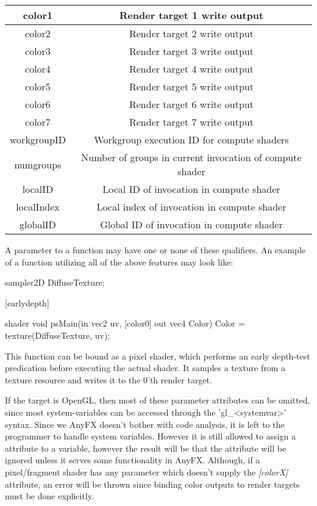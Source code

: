 \documentclass{article}
\begin{document}
\begin{table}[float]
{\begin{tabular} {| c | c |}
	color1 & Render target 1 write output \\ \hline
	color2 & Render target 2 write output \\ \hline
	color3 & Render target 3 write output \\ \hline
	color4 & Render target 4 write output \\ \hline
	color5 & Render target 5 write output \\ \hline
	color6 & Render target 6 write output \\ \hline
	color7 & Render target 7 write output \\ \hline
	workgroupID & Workgroup execution ID for compute shaders \\ \hline
	numgroups & Number of groups in current invocation of compute shader \\ \hline
	localID & Local ID of invocation in compute shader \\ \hline
	localIndex & Local index of invocation in compute shader \\ \hline
	globalID & Global ID of invocation in compute shader \\ \hline
\end{tabular}
}
\end{table}

A parameter to a function may have one or none of these qualifiers. An example of a function utilizing all of the above features may look like:

\begin{CodeBox}
sampler2D DiffuseTexture;

[earlydepth]

shader
void 
psMain(in vec2 uv, [color0] out vec4 Color)
{
	Color = texture(DiffuseTexture, uv);
}
\end{CodeBox}

This function can be bound as a pixel shader, which performs an early depth-test predication before executing the actual shader. It samples a texture from a texture resource and writes it to the 0'th render target. 

If the target is OpenGL, then most of these parameter attributes can be omitted, since most system-variables can be accessed through the 'gl\_\textless systemvar\textgreater' syntax. Since we AnyFX doesn't bother with code analysis, it is left to the programmer to handle system variables. However it is still allowed to assign a attribute to a variable, however the result will be that the attribute will be ignored unless it serves some functionality in AnyFX. Although, if a pixel/fragment shader has any parameter which doesn't supply the \textit{[colorX]} attribute, an error will be thrown since binding color outputs to render targets must be done explicitly.
\end{document}
